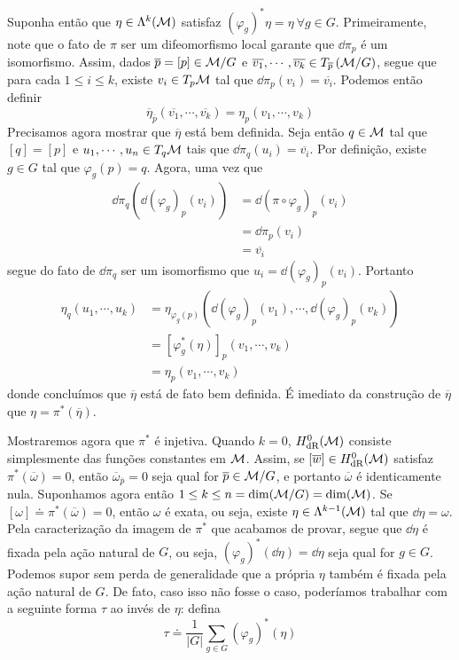 \begin{dem}
\begin{demm}
Suponha então que $\eta \in \Lambda^k(\mathcal{M})$ satisfaz $(\varphi_g)^{\ast}\eta = \eta \ \forall g \in G$. Primeiramente, note que o fato de $\pi$ ser um difeomorfismo local garante que $\dd \pi_p$ é um isomorfismo. Assim, dados $\overline{p} = [p] \in \mathcal{M}/G$ e $\overline{v_1}, \cdots, \overline{v_k} \in T_{\overline{p}}\left(\mathcal{M} / G \right)$, segue que para cada $1 \leq i \leq k$, existe $v_i \in T_p \mathcal{M}$ tal que $\dd \pi_p(v_i) = \overline{v_i}$. Podemos então definir
\[
\overline{\eta}_{\overline{p}}(\overline{v_1}, \cdots, \overline{v_k}) = \eta_p(v_1, \cdots, v_k)
\]
Precisamos agora mostrar que $\overline{\eta}$ está bem definida. Seja então $q \in \mathcal{M}$ tal que $[q] = [p]$ e $u_1, \cdots, u_n \in T_q \mathcal{M}$ tais que $\dd \pi_q (u_i) = \overline{v_i}$. Por definição, existe $g \in G$ tal que $\varphi_g(p) = q$. Agora, uma vez que
\begin{align*}
\dd \pi_q \left( \dd \left(\varphi_g \right)_p (v_i)\right) &= \dd\left(\pi \circ \varphi_g \right)_p(v_i) \\
&= \dd \pi_p (v_i) \\
&= \overline{v_i}
\end{align*}
segue do fato de $\dd \pi_q$ ser um isomorfismo que $u_i = \dd \left(\varphi_g \right)_p (v_i)$. Portanto
\begin{align*}
\eta_q(u_1, \cdots, u_k) &= \eta_{\varphi_g(p)}(\dd \left(\varphi_g \right)_p (v_1), \cdots, \dd \left(\varphi_g \right)_p (v_k)) \\
&= \left[\varphi_g^{\ast}(\eta) \right]_{p}(v_1, \cdots, v_k) \\
&=\eta_p(v_1, \cdots, v_k)
\end{align*}
donde concluímos que $\overline{\eta}$ está de fato bem definida. É imediato da construção de $\overline{\eta}$ que $\eta = \pi^{\ast}(\overline{\eta})$. \par 
Mostraremos agora que $\pi^{\ast}$ é injetiva. Quando $k = 0$, $H^0_{\text{dR}}(\mathcal{M})$ consiste simplesmente das funções constantes em $\mathcal{M}$. Assim, se $[\overline{w}] \in H^0_{\text{dR}}(\mathcal{M}) $ satisfaz $\pi^{\ast}(\overline{\omega}) = 0$, então $\overline{\omega}_{\overline{p}} = 0$ seja qual for $\overline{p} \in \mathcal{M} / G$, e portanto $\overline{\omega}$ é identicamente nula. Suponhamos agora então $1 \leq k \leq n = \dim(\mathcal{M} / G) = \dim(\mathcal{M})$. Se $[\omega] \doteq \pi^{\ast}(\overline{\omega}) = 0$, então $\omega$ é exata, ou seja, existe $\eta \in \Lambda^{k-1}(\mathcal{M})$ tal que $\dd \eta = \omega$. Pela caracterização da imagem de $\pi^{\ast}$ que acabamos de provar, segue que $\dd \eta$ é fixada pela ação natural de $G$, ou seja, $(\varphi_g)^{\ast}(\dd \eta) = \dd \eta$ seja qual for $g \in G$. Podemos supor sem perda de generalidade que a própria $\eta$ também é fixada pela ação natural de $G$. De fato, caso isso não fosse o caso, poderíamos trabalhar com a seguinte forma $\tau$ ao invés de $\eta$: defina $$\tau \doteq \frac{1}{|G|} \sum_{g \in G} (\varphi_g)^{\ast}(\eta)$$

\end{demm}
\end{dem}
